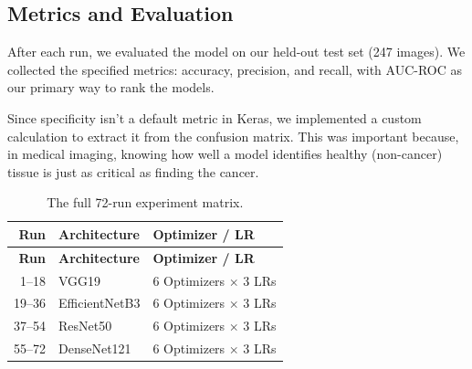 \subsection{Metrics and Evaluation}

After each run, we evaluated the model on our held-out test set (247 images). We collected the specified metrics: accuracy, precision, and recall, with AUC-ROC as our primary way to rank the models. 

Since specificity isn't a default metric in Keras, we implemented a custom calculation to extract it from the confusion matrix. This was important because, in medical imaging, knowing how well a model identifies healthy (non-cancer) tissue is just as critical as finding the cancer.

\begingroup
{}
\begin{longtable}{r l l}
  \caption[Experiment Matrix]{The full 72-run experiment matrix.}
  \label{tab:runs} \\
  \toprule
  \rowcolor{tableheader}
  \textbf{Run} & \textbf{Architecture} & \textbf{Optimizer / LR} \\
  \midrule
  \endfirsthead
  \toprule
  \rowcolor{tableheader}
  \textbf{Run} & \textbf{Architecture} & \textbf{Optimizer / LR} \\
  \midrule
  \endhead
  1--18   & VGG19          & 6 Optimizers $\times$ 3 LRs \\
  19--36  & EfficientNetB3 & 6 Optimizers $\times$ 3 LRs \\
  37--54  & ResNet50       & 6 Optimizers $\times$ 3 LRs \\
  55--72  & DenseNet121    & 6 Optimizers $\times$ 3 LRs \\
  \bottomrule
\end{longtable}
\endgroup
